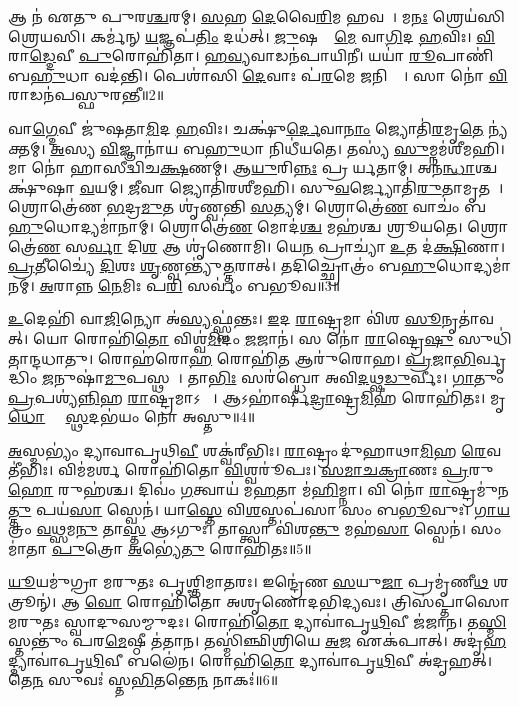 𑌆 𑌨॑ 𑌏𑌤𑍁 𑌪𑍁𑌰\ul{𑌶𑍍𑌚}𑌰𑌮𑍍।
\ul{𑌸}𑌹 \ul{𑌦𑍇}𑌵𑍈\ul{𑌰𑌿}𑌮 𑌹𑌵𑌮𑍍᳚।
𑌮\ul{𑌨𑌃} 𑌶𑍍𑌰𑍇𑌯॑𑌸𑌿𑌶𑍍𑌰𑍇𑌯𑌸𑌿।
𑌕𑌰𑍍𑌮॑𑌨𑍍 \ul{𑌯}𑌜𑍍𑌞𑌪॑\ul{𑌤𑌿𑌂} 𑌦𑌧॑𑌤𑍍।
\ul{𑌜𑍁}𑌷𑌤𑌾𑌂᳚ \ul{𑌮𑍇} 𑌵𑌾\ul{𑌗𑌿}𑌦 \ul{𑌹}𑌵𑌿𑌃।
\ul{𑌵𑌿}𑌰𑌾\ul{𑌡𑍍𑌦𑍇}𑌵𑍀 \ul{𑌪𑍁}𑌰𑍋𑌹𑌿॑𑌤𑌾।
\ul{𑌹}\ul{𑌵𑍍𑌯}𑌵𑌾𑌡𑌨॑𑌪𑌾𑌯𑌿𑌨𑍀।
𑌯𑌯𑌾॑ \ul{𑌰𑍂}𑌪𑌾𑌣𑌿॑ 𑌬\ul{𑌹𑍁}𑌧𑌾 𑌵𑌦॑𑌨𑍍𑌤𑌿।
𑌪𑍇𑌶𑌾॑𑌸𑌿 \ul{𑌦𑍇}𑌵𑌾𑌃 𑌪॑\ul{𑌰}𑌮𑍇 \ul{𑌜}𑌨𑌿𑌤𑍍𑌰𑍇᳚।
𑌸𑌾 𑌨𑍋॑ \ul{𑌵𑌿}𑌰𑌾𑌡𑌨॑𑌪𑌸𑍍𑌫𑍁𑌰𑌨𑍍𑌤𑍀॥2॥

𑌵𑌾\ul{𑌗𑍍𑌦𑍇}𑌵𑍀 𑌜𑍁॑𑌷𑌤𑌾\ul{𑌮𑌿}𑌦 \ul{𑌹}𑌵𑌿𑌃।
𑌚𑌕𑍍𑌷𑍁॑\ul{𑌰𑍍𑌦𑍇}𑌵𑌾\ul{𑌨𑌾𑌂} 𑌜𑍍𑌯𑍋𑌤𑌿॑\ul{𑌰}𑌮𑍃\ul{𑌤𑍇} 𑌨𑍍𑌯॑𑌕𑍍𑌤𑌮𑍍।
\ul{𑌅}𑌸𑍍𑌯 \ul{𑌵𑌿}𑌜𑍍𑌞𑌾𑌨𑌾॑𑌯 𑌬\ul{𑌹𑍁}𑌧𑌾 𑌨𑌿𑌧𑍀॑𑌯𑌤𑍇।
𑌤𑌸𑍍𑌯॑ \ul{𑌸𑍁}𑌮𑍍𑌨𑌮॑𑌶𑍀𑌮𑌹𑌿।
𑌮𑌾 𑌨𑍋॑ 𑌹𑌾𑌸𑍀𑌦𑍍𑌵𑌿𑌚\ul{𑌕𑍍𑌷}𑌣𑌮𑍍।
𑌆\ul{𑌯𑍁}𑌰𑌿\ul{𑌨𑍍𑌨𑌃} 𑌪𑍍𑌰𑌤𑍀᳚𑌰𑍍𑌯𑌤𑌾𑌮𑍍।
𑌅𑌨॑\ul{𑌨𑍍𑌧𑌾}𑌶𑍍𑌚𑌕𑍍𑌷𑍁॑𑌷𑌾 \ul{𑌵}𑌯𑌮𑍍।
\ul{𑌜𑍀}𑌵𑌾 𑌜𑍍𑌯𑍋𑌤𑌿॑𑌰𑌶𑍀𑌮𑌹𑌿।
𑌸𑍁\ul{𑌵}𑌰𑍍𑌜𑍍𑌯𑍋𑌤𑌿॑\ul{𑌰𑍁}𑌤𑌾𑌮𑍃𑌤𑌮𑍍᳚।
𑌶𑍍𑌰𑍋𑌤𑍍𑌰𑍇॑𑌣 \ul{𑌭}𑌦𑍍𑌰\ul{𑌮𑍁}𑌤 𑌶𑍃॑𑌣𑍍𑌵𑌨𑍍𑌤𑌿 \ul{𑌸}𑌤𑍍𑌯𑌮𑍍।
𑌶𑍍𑌰𑍋𑌤𑍍𑌰𑍇॑\ul{𑌣} 𑌵𑌾𑌚𑌂॑ 𑌬\ul{𑌹𑍁}𑌧𑍋𑌦𑍍𑌯𑌮𑌾॑𑌨𑌾𑌮𑍍।
𑌶𑍍𑌰𑍋𑌤𑍍𑌰𑍇॑\ul{𑌣} 𑌮𑍋𑌦॑\ul{𑌶𑍍𑌚} 𑌮𑌹॑𑌶𑍍𑌚 𑌶𑍍𑌰𑍂𑌯𑌤𑍇।
𑌶𑍍𑌰𑍋𑌤𑍍𑌰𑍇॑\ul{𑌣} 𑌸\ul{𑌰𑍍𑌵𑌾} 𑌦𑌿\ul{𑌶} 𑌆 𑌶𑍃॑𑌣𑍋𑌮𑌿।
𑌯𑍇\ul{𑌨} 𑌪𑍍𑌰𑌾𑌚𑍍𑌯𑌾॑ \ul{𑌉}𑌤 𑌦॑\ul{𑌕𑍍𑌷𑌿}𑌣𑌾।
\ul{𑌪𑍍𑌰}𑌤𑍀𑌚𑍍𑌯𑍈॑ \ul{𑌦𑌿}𑌶𑌃 \ul{𑌶𑍃}𑌣𑍍𑌵𑌨𑍍𑌤𑍍𑌯𑍁॑\ul{𑌤𑍍𑌤}𑌰𑌾𑌤𑍍।
𑌤𑌦𑌿𑌚𑍍𑌛𑍍𑌰𑍋𑌤𑍍𑌰𑌂॑ 𑌬\ul{𑌹𑍁}𑌧𑍋𑌦𑍍𑌯𑌮𑌾॑𑌨𑌮𑍍।
\ul{𑌅}𑌰𑌾𑌨𑍍𑌨 \ul{𑌨𑍇}𑌮𑌿𑌃 𑌪\ul{𑌰𑌿} 𑌸𑌰𑍍𑌵𑌂॑ 𑌬𑌭𑍂𑌵॥3॥

\ul{𑌉}𑌦𑍇𑌹𑌿॑ 𑌵𑌾\ul{𑌜𑌿}𑌨𑍍𑌯𑍋 𑌅॑\ul{𑌸𑍍𑌯}𑌫𑍍𑌸𑍍𑌵॑𑌨𑍍𑌤𑌃।
\ul{𑌇}𑌦 \ul{𑌰𑌾}𑌷𑍍𑌟𑍍𑌰𑌮𑌾 𑌵𑌿॑𑌶 \ul{𑌸𑍂}𑌨𑍃𑌤𑌾॑𑌵𑌤𑍍।
𑌯𑍋 𑌰𑍋𑌹𑌿॑\ul{𑌤𑍋} 𑌵𑌿𑌶𑍍𑌵॑\ul{𑌮𑌿}𑌦𑌂 \ul{𑌜}𑌜𑌾𑌨॑।
𑌸 𑌨𑍋॑ \ul{𑌰𑌾}𑌷𑍍𑌟𑍍𑌰𑍇\ul{𑌷𑍁} 𑌸𑍁𑌧𑌿॑𑌤𑌾𑌨𑍍𑌦𑌧𑌾𑌤𑍁।
𑌰𑍋𑌹॑𑌰𑍋\ul{𑌹}\ul{} 𑌰𑍋𑌹𑌿॑\ul{𑌤} 𑌆𑌰𑍁॑𑌰𑍋𑌹।
\ul{𑌪𑍍𑌰}𑌜𑌾\ul{𑌭𑌿}𑌰𑍍𑌵𑍃𑌦𑍍𑌧𑌿𑌂॑ \ul{𑌜}𑌨𑍁𑌷𑌾॑\ul{𑌮𑍁}𑌪𑌸𑍍𑌥𑌮𑍍᳚।
𑌤𑌾\ul{𑌭𑌿𑌃} 𑌸𑌰॑𑌬𑍍𑌧𑍋 𑌅𑌵𑌿\ul{𑌦}𑌥𑍍𑌷\ul{𑌡𑍁}𑌰𑍍𑌵𑍀𑌃।
\ul{𑌗𑌾}𑌤𑍁𑌂 \ul{𑌪𑍍𑌰}𑌪𑌶𑍍𑌯॑\ul{𑌨𑍍𑌨𑌿}𑌹 \ul{𑌰𑌾}𑌷𑍍𑌟𑍍𑌰𑌮𑌾\-𑌽𑌹𑌾𑌃᳚।
𑌆𑌽𑌹𑌾॑𑌰𑍍\mbox{}𑌷𑍀\ul{𑌦𑍍𑌰𑌾}𑌷𑍍𑌟𑍍𑌰\ul{𑌮𑌿}𑌹 𑌰𑍋𑌹𑌿॑𑌤𑌃।
𑌮𑍃\ul{𑌧𑍋} 𑌵𑍍𑌯𑌾᳚\ul{𑌸𑍍𑌥}𑌦𑌭॑𑌯𑌂 𑌨𑍋 𑌅𑌸𑍍𑌤𑍁॥4॥

\ul{𑌅}𑌸𑍍𑌮𑌭𑍍𑌯𑌂॑ 𑌦𑍍𑌯𑌾𑌵𑌾𑌪𑍃𑌥𑌿\ul{𑌵𑍀} 𑌶𑌕𑍍𑌵॑𑌰𑍀𑌭𑌿𑌃।
\ul{𑌰𑌾}𑌷𑍍𑌟𑍍𑌰𑌂 𑌦𑍁॑𑌹𑌾𑌥𑌾\ul{𑌮𑌿}𑌹 \ul{𑌰𑍇}𑌵𑌤𑍀॑𑌭𑌿𑌃।
𑌵𑌿𑌮॑𑌮𑌰𑍍\mbox{}\ul{𑌶} 𑌰𑍋𑌹𑌿॑𑌤𑍋 \ul{𑌵𑌿}𑌶𑍍𑌵𑌰𑍂॑𑌪𑌃।
\ul{𑌸}\ul{𑌮𑌾}\ul{𑌚}\ul{𑌕𑍍𑌰𑌾}𑌣𑌃 \ul{𑌪𑍍𑌰}𑌰𑍁\ul{𑌹𑍋} 𑌰𑍁𑌹॑𑌶𑍍𑌚।
𑌦𑌿𑌵𑌂॑ \ul{𑌗}𑌤𑍍𑌵𑌾𑌯॑ 𑌮\ul{𑌹}𑌤𑌾 𑌮॑\ul{𑌹𑌿}𑌮𑍍𑌨𑌾।
𑌵𑌿 𑌨𑍋॑ \ul{𑌰𑌾}𑌷𑍍𑌟𑍍𑌰𑌮𑍁॑𑌨\ul{𑌤𑍍𑌤𑍁} 𑌪𑌯॑\ul{𑌸𑌾} 𑌸𑍍𑌵𑍇𑌨॑।
𑌯𑌾\ul{𑌸𑍍𑌤𑍇} 𑌵𑌿\ul{𑌶}𑌸𑍍𑌤𑌪॑𑌸𑌾 𑌸𑌂 𑌬\ul{𑌭𑍂}𑌵𑍁𑌃।
\ul{𑌗𑌾}\ul{𑌯}𑌤𑍍𑌰𑌂 \ul{𑌵}𑌥𑍍𑌸𑌮\ul{𑌨𑍁} 𑌤𑌾\ul{𑌸𑍍𑌤} 𑌆𑌽𑌗𑍁𑌃॑।
𑌤𑌾𑌸𑍍𑌤𑍍𑌵𑌾 𑌵𑌿॑𑌶\ul{𑌨𑍍𑌤𑍁} 𑌮𑌹॑\ul{𑌸𑌾} 𑌸𑍍𑌵𑍇𑌨॑।
𑌸𑌂 𑌮𑌾॑𑌤𑌾 \ul{𑌪𑍁}𑌤𑍍𑌰𑍋 \ul{𑌅}𑌭𑍍𑌯𑍇॑\ul{𑌤𑍁} 𑌰𑍋𑌹𑌿॑𑌤𑌃॥5॥

\ul{𑌯𑍂}𑌯𑌮𑍁॑𑌗𑍍𑌰𑌾 𑌮𑌰𑍁𑌤𑌃 𑌪𑍃𑌶𑍍𑌞𑌿𑌮𑌾𑌤𑌰𑌃।
𑌇𑌨𑍍𑌦𑍍𑌰𑍇॑𑌣 \ul{𑌸}𑌯𑍁\ul{𑌜𑌾} 𑌪𑍍𑌰𑌮𑍃॑𑌣𑍀\ul{𑌥} 𑌶𑌤𑍍𑌰𑍂𑌨𑍍॑।
𑌆 \ul{𑌵𑍋} 𑌰𑍋𑌹𑌿॑𑌤𑍋 𑌅𑌶𑍃𑌣𑍋𑌦𑌭𑌿𑌦𑍍𑌯𑌵𑌃।
𑌤𑍍𑌰𑌿𑌸॑𑌪𑍍𑌤𑌾𑌸𑍋 𑌮𑌰𑍁𑌤𑌃 𑌸𑍍𑌵𑌾𑌦𑍁𑌸𑌮𑍍𑌮𑍁𑌦𑌃।
𑌰𑍋𑌹𑌿॑\ul{𑌤𑍋} 𑌦𑍍𑌯𑌾𑌵𑌾॑𑌪𑍃\ul{𑌥𑌿}𑌵𑍀 𑌜॑𑌜𑌾𑌨।
𑌤\ul{𑌸𑍍𑌮𑌿}\ul{}𑌸𑍍𑌤𑌨𑍍𑌤𑍁𑌂॑ 𑌪𑌰\ul{𑌮𑍇}𑌷𑍍𑌠𑍀 𑌤॑𑌤𑌾𑌨।
𑌤𑌸𑍍𑌮𑌿॑𑌞𑍍𑌛𑌿𑌶𑍍𑌰𑌿𑌯𑍇 \ul{𑌅}𑌜 𑌏𑌕॑𑌪𑌾𑌤𑍍।
𑌅𑌦𑍃॑\ul{𑌹}𑌦𑍍𑌦𑍍𑌯𑌾𑌵𑌾॑𑌪𑍃\ul{𑌥𑌿}𑌵𑍀 𑌬𑌲𑍇॑𑌨।
𑌰𑍋𑌹𑌿॑\ul{𑌤𑍋} 𑌦𑍍𑌯𑌾𑌵𑌾॑𑌪𑍃\ul{𑌥𑌿}𑌵𑍀 𑌅॑𑌦𑍃𑌹𑌤𑍍।
𑌤𑍇\ul{𑌨} 𑌸𑍁𑌵𑌃॑ 𑌸𑍍𑌤\ul{𑌭𑌿}𑌤𑌨𑍍𑌤𑍇\ul{𑌨} 𑌨𑌾𑌕𑌃॑॥6॥

